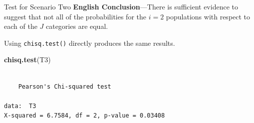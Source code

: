 \documentclass[
  ignorenonframetext,
]{beamer}
\newenvironment{Shaded}{\begin{snugshade}}{\end{snugshade}}
\newcommand{\FunctionTok}[1]{\textcolor[rgb]{0.13,0.29,0.53}{\textbf{#1}}}
\newcommand{\NormalTok}[1]{#1}
\begin{document}
\begin{frame}[fragile]{Test for Scenario Two}
\label{test-for-scenario-two-5}
\textbf{English Conclusion}---There is sufficient evidence to suggest
that not all of the probabilities for the \(i=2\) populations with
respect to each of the \(J\) categories are equal.

Using \texttt{chisq.test()} directly produces the same results.

\begin{Shaded}
\begin{Highlighting}[]
\FunctionTok{chisq.test}\NormalTok{(T3)}
\end{Highlighting}
\end{Shaded}

\begin{verbatim}

    Pearson's Chi-squared test

data:  T3
X-squared = 6.7584, df = 2, p-value = 0.03408
\end{verbatim}
\end{frame}
\end{document}
